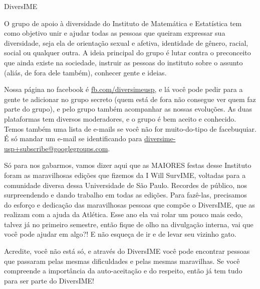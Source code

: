 \begin{subsecao}{DiversIME}


O grupo de apoio à diversidade do Instituto de Matemática e Estatística tem como
objetivo unir e ajudar todas as pessoas que queiram expressar sua diversidade,
seja ela de orientação sexual e afetiva, identidade de gênero, racial, social ou
qualquer outra. A ideia principal do grupo é lutar contra o preconceito que ainda
existe na sociedade, instruir as pessoas do instituto sobre o assunto (aliás,
de fora dele também), conhecer gente e ideias.

Nossa página no facebook é \url{fb.com/diversimeusp}, e lá você pode pedir para
a gente te adicionar no grupo secreto (quem está de fora não consegue ver quem
faz parte do grupo), e pelo grupo também acompanhar as nossas evoluções. As duas
plataformas tem diversos moderadores, e o grupo é bem aceito e conhecido. Temos também
uma lista de e-mails se você não for muito-do-tipo de facebuquiar. É só mandar
um e-mail se identificando para \url{diversime-usp+subscribe@googlegroups.com}.

Só para nos gabarmos, vamos dizer aqui que as MAIORES festas desse Instituto
foram as maravilhosas edições que fizemos da I Will SurvIME, voltadas para a
comunidade diversa dessa Universidade de São Paulo. Recordes de público, nos
surpreendendo e dando trabalho em todas as edições. Para fazê-las, precisamos
do esforço e dedicação das maravilhosas pessoas que compõe o DiversIME, que
as realizam com a ajuda da Atlética. Esse ano ela vai rolar um pouco mais cedo,
talvez já no primeiro semestre, então fique de olho na divulgação interna, vai
que você pode ajudar em algo?! E não esqueça de ir e de levar seu vizinho gato.

Acredite, você não está só, e através do DiversIME você pode encontrar pessoas
que passaram pelas mesmas dificuldades e pelas mesmas maravilhas. Se você compreende
a importância da auto-aceitação e do respeito, então já tem tudo para ser parte
do DiversIME!

\end{subsecao}
